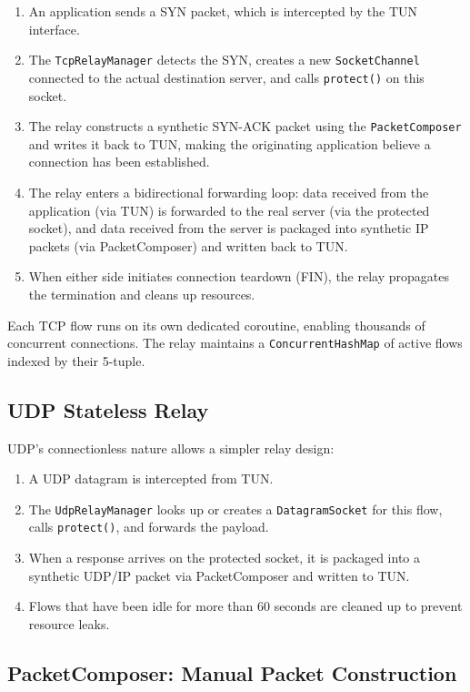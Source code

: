 \begin{enumerate}[noitemsep]
    \item An application sends a SYN packet, which is intercepted by the TUN interface.
    \item The \texttt{TcpRelayManager} detects the SYN, creates a new \texttt{SocketChannel} connected to the actual destination server, and calls \texttt{protect()} on this socket.
    \item The relay constructs a synthetic SYN-ACK packet using the \texttt{PacketComposer} and writes it back to TUN, making the originating application believe a connection has been established.
    \item The relay enters a bidirectional forwarding loop: data received from the application (via TUN) is forwarded to the real server (via the protected socket), and data received from the server is packaged into synthetic IP packets (via PacketComposer) and written back to TUN.
    \item When either side initiates connection teardown (FIN), the relay propagates the termination and cleans up resources.
\end{enumerate}

Each TCP flow runs on its own dedicated coroutine, enabling thousands of concurrent connections. The relay maintains a \texttt{ConcurrentHashMap} of active flows indexed by their 5-tuple.

\subsection{UDP Stateless Relay}

UDP's connectionless nature allows a simpler relay design:

\begin{enumerate}[noitemsep]
    \item A UDP datagram is intercepted from TUN.
    \item The \texttt{UdpRelayManager} looks up or creates a \texttt{DatagramSocket} for this flow, calls \texttt{protect()}, and forwards the payload.
    \item When a response arrives on the protected socket, it is packaged into a synthetic UDP/IP packet via PacketComposer and written to TUN.
    \item Flows that have been idle for more than 60 seconds are cleaned up to prevent resource leaks.
\end{enumerate}

\subsection{PacketComposer: Manual Packet Construction}

